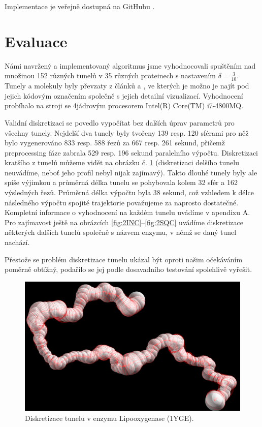 Implementace je veřejně dostupná na GitHubu \cite{discretizer}.





\section{Evaluace} \label{subsec:evaluation}
Námi navržený a implementovaný algoritmus jsme vyhodnocovali spuštěním nad
množinou 152 různých tunelů v 35 různých proteinech s nastavením $ \delta = \frac{3}{10} $.
Tunely a molekuly byly převzaty z článků \cite{Enzymes} a \cite{Caver}, ve
kterých je možno
je najít pod jejich kódovým označením společně s jejich detailní vizualizací.
Vyhodnocení probíhalo na stroji se 4jádrovým procesorem Intel(R) Core(TM) i7-4800MQ.

Validní diskretizaci se povedlo vypočítat bez dalších úprav parametrů pro všechny
tunely. Nejdelší dva tunely byly tvořeny 139 resp. 120 sférami pro něž bylo
vygenerováno 833 resp. 588 řezů za 667 resp. 261 sekund, přičemž preprocessing
fáze zabrala 529 resp. 196 sekund paralelního výpočtu. Diskretizaci kratšího
z tunelů můžeme vidět na obrázku č. \ref{fig:1YGE} (diskretizaci delšího tunelu
neuvádíme, neboť jeho profil nebyl nijak zajímavý). Takto dlouhé tunely byly ale
spíše výjimkou a průměrná délka tunelu se pohybovala kolem 32 sfér a 162
výsledných řezů. Průměrná délka výpočtu byla 38 sekund, což vzhledem k délce
následného výpočtu spojité trajektorie považujeme za naprosto dostatečné.
Kompletní informace o vyhodnocení na každém tunelu uvádíme v apendixu A.
Pro zajímavost ještě na obrázcích \ref{fig:2INC}–\ref{fig:2SQC} uvádíme
diskretizace některých dalších tunelů společně s názvem enzymu, v němž se daný
tunel nachází.

Přestože se problém diskretizace tunelu ukázal být oproti našim očekáváním
poměrně obtížný, podařilo se jej podle dosavadního testování spolehlivě vyřešit.

\begin{figure}[ht]
    \centering
    \includegraphics[width=.75\textwidth]{img/1YGE.png}
    \caption{Diskretizace tunelu v enzymu Lipooxygenase (1YGE).}
  \centering
  \label{fig:1YGE}
\end{figure}

